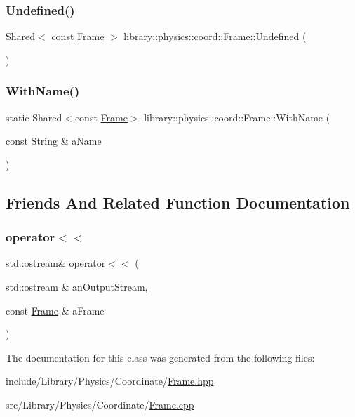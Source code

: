 \subsubsection{\texorpdfstring{Undefined()}{Undefined()}}
{\footnotesize\ttfamily Shared$<$ const \hyperlink{classlibrary_1_1physics_1_1coord_1_1_frame}{Frame} $>$ library\+::physics\+::coord\+::\+Frame\+::\+Undefined (\begin{DoxyParamCaption}{ }\end{DoxyParamCaption})\hspace{0.3cm}{\ttfamily [static]}}

\mbox{\label{classlibrary_1_1physics_1_1coord_1_1_frame_aedf877cc541f88598bb85e24aa3994da}} 
\subsubsection{\texorpdfstring{With\+Name()}{WithName()}}
{\footnotesize\ttfamily static Shared$<$const \hyperlink{classlibrary_1_1physics_1_1coord_1_1_frame}{Frame}$>$ library\+::physics\+::coord\+::\+Frame\+::\+With\+Name (\begin{DoxyParamCaption}\item[{const String \&}]{a\+Name }\end{DoxyParamCaption})\hspace{0.3cm}{\ttfamily [static]}}



\subsection{Friends And Related Function Documentation}
\mbox{\label{classlibrary_1_1physics_1_1coord_1_1_frame_a509ac1926cfc3553748bace204e2b1cc}} 
\subsubsection{\texorpdfstring{operator$<$$<$}{operator<<}}
{\footnotesize\ttfamily std\+::ostream\& operator$<$$<$ (\begin{DoxyParamCaption}\item[{std\+::ostream \&}]{an\+Output\+Stream,  }\item[{const \hyperlink{classlibrary_1_1physics_1_1coord_1_1_frame}{Frame} \&}]{a\+Frame }\end{DoxyParamCaption})\hspace{0.3cm}{\ttfamily [friend]}}



The documentation for this class was generated from the following files\+:\begin{DoxyCompactItemize}
\item 
include/\+Library/\+Physics/\+Coordinate/\hyperlink{_frame_8hpp}{Frame.\+hpp}\item 
src/\+Library/\+Physics/\+Coordinate/\hyperlink{_frame_8cpp}{Frame.\+cpp}\end{DoxyCompactItemize}
